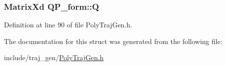 \subsubsection[{\texorpdfstring{Q}{Q}}]{\setlength{\rightskip}{0pt plus 5cm}Matrix\+Xd Q\+P\+\_\+form\+::Q}\hypertarget{struct_q_p__form_a5613317ae662dd137324ee52ca52b1ae}{}\label{struct_q_p__form_a5613317ae662dd137324ee52ca52b1ae}


Definition at line 90 of file Poly\+Traj\+Gen.\+h.



The documentation for this struct was generated from the following file\+:\begin{DoxyCompactItemize}
\item 
include/traj\+\_\+gen/\hyperlink{_poly_traj_gen_8h}{Poly\+Traj\+Gen.\+h}\end{DoxyCompactItemize}
